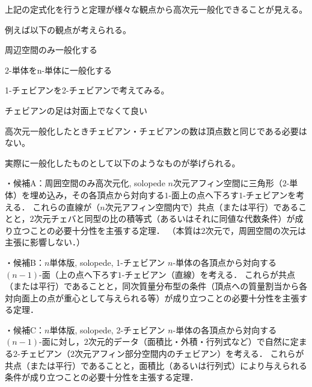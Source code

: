 \documentclass[a4paper,12pt]{bxjsbook}
\newlength{\customindent}
\newenvironment{body}{
  \par
  \begingroup
  \setlength{\leftskip}{\customindent}
  \setlength{\rightskip}{0pt}
  \setlength{\parindent}{1em}
  \setlength{\displayindent}{\customindent}
  \setlength{\displaywidth}{\dimexpr\linewidth-\customindent\relax}
}{
  \par
  \endgroup
}
\theoremstyle{theorem}
\begin{document}
    \begin{body}
        \indent 上記の定式化を行うと定理が様々な観点から高次元一般化できることが見える。

        \indent 例えば以下の観点が考えられる。

        \begin{bodyitemize}
            \item 周辺空間のみ一般化する
            \item 2-単体をn-単体に一般化する
            \item 1-チェビアンを2-チェビアンで考えてみる。
            \item チェビアンの足は対面上でなくて良い
            \item 高次元一般化したときチェビアン・チェビアンの数は頂点数と同じである必要はない。
        \end{bodyitemize}

        \indent 実際に一般化したものとして以下のようなものが挙げられる。

        \begin{bodydescription}
            \item[\hspace*{1.5em}・候補A：周囲空間のみ高次元化, solopede]
            $n$次元アフィン空間に三角形（$2$-単体）を埋め込み，その各頂点から対向する$1$-面上の点へ下ろす$1$-チェビアンを考える．
            これらの直線が（$n$次元アフィン空間内で）共点（または平行）であることと，$2$次元チェバと同型の比の積等式（あるいはそれに同値な代数条件）が成り立つことの必要十分性を主張する定理．
            （本質は$2$次元で，周囲空間の次元は主張に影響しない．）
            
            \item[\hspace*{1.5em}・候補B：$n$単体版, solopede, 1-チェビアン]
            $n$-単体の各頂点から対向する$(n-1)$-面（上の点へ下ろす$1$-チェビアン（直線）を考える．
            これらが共点（または平行）であることと，同次質量分布型の条件（頂点への質量割当から各対向面上の点が重心として与えられる等）が成り立つことの必要十分性を主張する定理．
            
            \item[\hspace*{1.5em}・候補C：$n$単体版, solopede, 2-チェビアン]
            $n$-単体の各頂点から対向する$(n-1)$-面に対し，$2$次元的データ（面積比・外積・行列式など）で自然に定まる$2$-チェビアン（$2$次元アフィン部分空間内のチェビアン）を考える．
            これらが共点（または平行）であることと，面積比（あるいは行列式）により与えられる条件が成り立つことの必要十分性を主張する定理．
            

\end{bodydescription}
\end{body}
\end{document}
